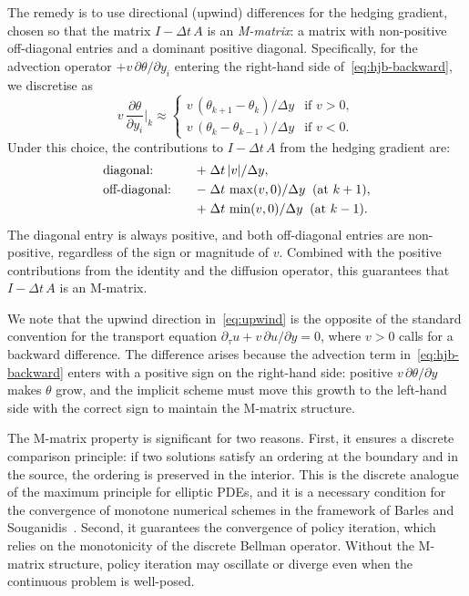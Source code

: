 The remedy is to use directional (upwind) differences for the hedging gradient, chosen so that the matrix $I - \Delta t\,A$ is an \emph{M-matrix}: a matrix with non-positive off-diagonal entries and a dominant positive diagonal. Specifically, for the advection operator $+v\,\partial\theta/\partial y_i$ entering the right-hand side of~\eqref{eq:hjb-backward}, we discretise as
\begin{equation}
  \label{eq:upwind}
  v\,\frac{\partial\theta}{\partial y_i}\bigg|_k \approx \begin{cases}
    v\,(\theta_{k+1} - \theta_k) / \Delta y & \text{if } v > 0, \\
    v\,(\theta_k - \theta_{k-1}) / \Delta y & \text{if } v < 0.
  \end{cases}
\end{equation}
Under this choice, the contributions to $I - \Delta t\,A$ from the hedging gradient are:
\begin{alignat}{2}
  &\text{diagonal:}      &\quad &{+}\;\Delta t\,|v|/\Delta y, \label{eq:upwind-diag} \\
  &\text{off-diagonal:}  &\quad &{-}\;\Delta t\,\max(v, 0)/\Delta y \;\;\text{(at $k+1$)}, \notag \\
  &                      &\quad &{+}\;\Delta t\,\min(v, 0)/\Delta y \;\;\text{(at $k-1$)}. \notag
\end{alignat}
The diagonal entry is always positive, and both off-diagonal entries are non-positive, regardless of the sign or magnitude of $v$. Combined with the positive contributions from the identity and the diffusion operator, this guarantees that $I - \Delta t\,A$ is an M-matrix.

We note that the upwind direction in~\eqref{eq:upwind} is the opposite of the standard convention for the transport equation $\partial_\tau u + v\,\partial u/\partial y = 0$, where $v > 0$ calls for a backward difference. The difference arises because the advection term in~\eqref{eq:hjb-backward} enters with a positive sign on the right-hand side: positive $v\,\partial\theta/\partial y$ makes $\theta$ grow, and the implicit scheme must move this growth to the left-hand side with the correct sign to maintain the M-matrix structure.

The M-matrix property is significant for two reasons. First, it ensures a discrete comparison principle: if two solutions satisfy an ordering at the boundary and in the source, the ordering is preserved in the interior. This is the discrete analogue of the maximum principle for elliptic PDEs, and it is a necessary condition for the convergence of monotone numerical schemes in the framework of Barles and Souganidis~\cite{barles1991}. Second, it guarantees the convergence of policy iteration, which relies on the monotonicity of the discrete Bellman operator. Without the M-matrix structure, policy iteration may oscillate or diverge even when the continuous problem is well-posed.

